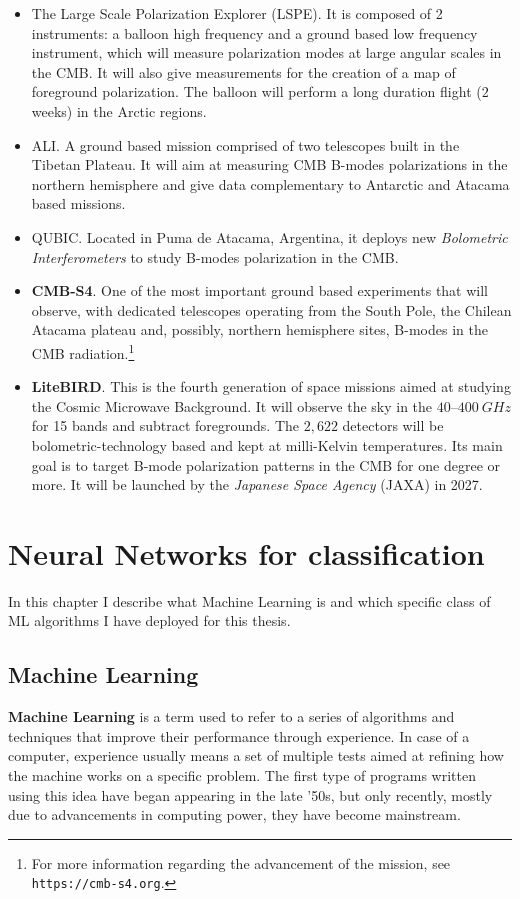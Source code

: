 \documentclass[12pt,a4paper,final]{book}			%
\begin{document}
\begin{itemize}
				\item The Large Scale Polarization Explorer (LSPE). It is composed of 2 instruments: a balloon high frequency and a ground based low frequency instrument, which will measure polarization modes at large angular scales in the CMB. It will also give measurements for the creation of a map of foreground polarization. The balloon will perform a long duration flight ($2$ weeks) in the Arctic regions. \cite{LSPE}
				
				\item ALI. A ground based mission comprised of two telescopes built in the Tibetan Plateau. It will aim at measuring CMB B-modes polarizations in the northern hemisphere and give data complementary to Antarctic and Atacama based missions. \cite{ALI}
				
				\item QUBIC. Located in Puma de Atacama, Argentina, it deploys new \textit{Bolometric Interferometers} to study B-modes polarization in the CMB. \cite{QUBIC}
				
				\item \textbf{CMB-S4}. One of the most important ground based experiments that will observe, with dedicated telescopes operating from the South Pole, the Chilean Atacama plateau and, possibly, northern hemisphere sites, B-modes in the CMB radiation.\footnote{For more information regarding the advancement of the mission, see \texttt{https://cmb-s4.org}.}
				
				\item \textbf{LiteBIRD}. This is the fourth generation of space missions aimed at studying the Cosmic Microwave Background. It will observe the sky in the $40–400~\unit{GHz}$ for 15 bands and subtract foregrounds. The $2,622$ detectors will be bolometric-technology based and kept at milli-Kelvin temperatures. Its main goal is to target B-mode polarization patterns in the CMB for one degree or more. It will be launched by the \textit{Japanese Space Agency} (JAXA) in 2027. \cite{LiteBIRD}
			\end{itemize}
			
				
	\chapter{Neural Networks for classification}\label{machine_learning}
		In this chapter I describe what Machine Learning is and which specific class of ML algorithms I have deployed for this thesis.	

		\section{Machine Learning}	
		\textbf{Machine Learning} is a term used to refer to a series of algorithms and techniques that improve their performance through experience. In case of a computer, experience usually means a set of multiple tests aimed at refining how the machine works on a specific problem. The first type of programs written using this idea have began appearing in the late '50s, but only recently, mostly due to advancements in computing power, they have become mainstream.		
		
\end{document}
